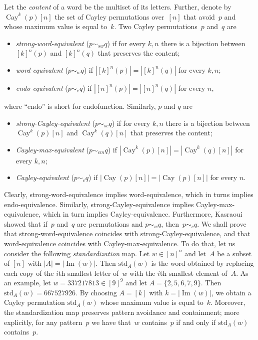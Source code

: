 \documentclass[a4paper, 11pt]{article}
\DeclareMathOperator{\Cay}{Cay}
\DeclareMathOperator{\Img}{Im}
\newcommand{\std}{\mathrm{std}}
\theoremstyle{definition}
\begin{document}
Let the \emph{content} of a word be the multiset of its
letters. Further, denote by $\Cay^k(p)[n]$ the set of Cayley
permutations over~$[n]$ that avoid~$p$ and whose maximum value is
equal to~$k$. Two Cayley permutations~$p$ and~$q$ are
\begin{itemize}
\item \emph{strong-word-equivalent} ($p\sim_{sw} q$) if for
every $k,n$ there is a bijection between $[k]^n(p)$ and $[k]^n(q)$
that preserves the content;
\item \emph{word-equivalent} ($p\sim_{w} q$) if $|[k]^n(p)|=|[k]^n(q)|$
for every $k,n$;
\item \emph{endo-equivalent} ($p\sim_{e} q$) if
$|[n]^n(p)|=|[n]^n(q)|$ for every $n$,
\end{itemize}
where ``endo'' is short for endofunction. Similarly, $p$ and $q$ are
\begin{itemize}
\item \emph{strong-Cayley-equivalent} ($p\sim_{sc} q$) if for
every $k,n$ there is a bijection between $\Cay^k(p)[n]$ and $\Cay^k(q)[n]$
that preserves the content;
\item \emph{Cayley-max-equivalent} ($p\sim_{cm} q$) if
$|\Cay^k(p)[n]|=|\Cay^k(q)[n]|$ for every $k,n$;
\item \emph{Cayley-equivalent} ($p\sim_{c} q$) if
$|\Cay(p)[n]|=|\Cay(p)[n]|$ for every $n$.
\end{itemize}

Clearly, strong-word-equivalence implies word-equivalence, which in
turns implies endo-equivalence. Similarly, strong-Cayley-equivalence
implies Cayley-max-equival\-ence, which in turn implies Cayley-equivalence.
Furthermore, Kasraoui~\cite[Proposition~1.1]{KASRAOUI} showed
that if~$p$ and~$q$ are permutations and $p\sim_w q$, then~$p\sim_c q$.
We shall prove that strong-word-equivalence coincides with
strong-Cayley-equivalence, and that word-equivalence coincides with
Cayley-max-equivalence.
To do that, let us consider the following \emph{standardization} map.
Let $w\in [n]^n$ and let~$A$ be a subset of $[n]$ with $|A|=|\Img(w)|$.
Then $\std_A(w)$ is the word obtained by replacing each copy of
the $i$th smallest letter of~$w$ with the $i$th smallest element of~$A$.
As an example, let $w=337217813\in [9]^9$ and let $A=\{2,5,6,7,9\}$.
Then $\std_A(w)=667527926$.
By choosing $A=[k]$ with $k=|\Img(w)|$, we obtain a Cayley permutation
$\std_A(w)$ whose maximum value is equal to~$k$. Moreover,
the standardization map preserves pattern avoidance and containment;
more explicitly, for any pattern~$p$ we have that~$w$ contains~$p$
if and only if $\std_A(w)$ contains~$p$. 
\end{document}
